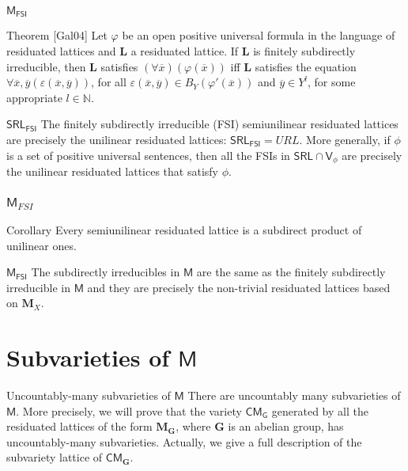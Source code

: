 \documentclass[professionalfont, handout, 10pt]{beamer} %
\theoremstyle{plain}
\theoremstyle{definition}
\newcommand{\m}[1]{{\mathbf {#1} }}
\newcommand{\bb}[1]{\mathbb {#1}}
\begin{document}
\begin{frame}{$\mathsf{M_{FSI}}$}
    \begin{block}{Theorem [Gal04]}
        Let $\varphi$ be an open positive universal formula in the language of residuated lattices and $\m L$ a residuated lattice.
        If $\m L$ is finitely subdirectly irreducible, then $\m L$ satisfies $(\forall \overline{x})(\varphi(\overline{x}))$ iff $\m L$ satisfies the equation $\forall \overline{x}, \overline{y} (\varepsilon(\overline{x}, \overline{y}))$, for all $\varepsilon(\overline{x}, \overline{y}) \in B_Y(\varphi'(\overline{x}))$ and $\overline{y} \in Y^l$, for some appropriate $l \in \bb{N}$.
    \end{block}
    \pause
    
    \begin{block}{$\mathsf{SRL_{FSI}}$}
        The finitely subdirectly irreducible (FSI) semiunilinear residuated lattices are precisely the unilinear residuated lattices: $\mathsf{SRL_{FSI}} = URL$.
        More generally, if $\phi$ is a set of positive universal sentences, then all the FSIs in  $\mathsf{SRL} \cap \mathsf{V}_\phi$ are precisely the unilinear residuated lattices that satisfy $\phi$.
    \end{block}
\end{frame}

\begin{frame}
\frametitle{$\mathsf{M}_{FSI}$}
\begin{block}{Corollary}
        Every semiunilinear residuated lattice is a subdirect product of unilinear ones.
    \end{block}

    \pause

    \begin{block}{$\mathsf{M_{FSI}}$}
        The subdirectly irreducibles in $\mathsf{M}$ are the same as the finitely subdirectly irreducible in $\mathsf{M}$ and they are precisely the non-trivial residuated lattices based on $\mathbf{M}_X$.
    \end{block}    
\end{frame}

\section{Subvarieties of $\mathsf{M}$}

\begin{frame}{Uncountably-many subvarieties of $\mathsf{M}$}
There are uncountably many subvarieties of $\mathsf{M}$. \pause
More precisely, we will prove that the variety $\mathsf{CM_G}$ generated by all the residuated lattices of the form $\mathbf{M}_{\mathbf{G}}$, where $\mathbf{G}$ is an abelian group, has uncountably-many subvarieties.
Actually, we give a full description of the subvariety lattice of $\mathsf{CM}_{\mathbf{G}}$.
\end{frame}
\end{document}

